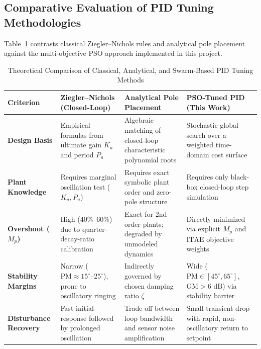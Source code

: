 \documentclass[11pt,a4paper]{article}
\begin{document}
\subsection{Comparative Evaluation of PID Tuning Methodologies}
Table~\ref{tab:method_comparison} contrasts classical Ziegler--Nichols rules and analytical pole placement against the multi-objective PSO approach implemented in this project.

\begin{table}[H]
  \centering
  \caption{Theoretical Comparison of Classical, Analytical, and Swarm-Based PID Tuning Methods}
  \label{tab:method_comparison}
  \small
  \begin{tabularx}{\textwidth}{>{\raggedright\arraybackslash}p{} >{\raggedright\arraybackslash}X >{\raggedright\arraybackslash}X >{\raggedright\arraybackslash}X}
    \toprule
    \textbf{Criterion} & \textbf{Ziegler--Nichols (Closed-Loop)} & \textbf{Analytical Pole Placement} & \textbf{PSO-Tuned PID (This Work)} \\
    \midrule
    \textbf{Design Basis} & Empirical formulas from ultimate gain $K_u$ and period $P_u$ & Algebraic matching of closed-loop characteristic polynomial roots & Stochastic global search over a weighted time-domain cost surface \\
    \addlinespace[3pt]
    \textbf{Plant Knowledge} & Requires marginal oscillation test ($K_u, P_u$) & Requires exact symbolic plant order and zero-pole structure & Requires only black-box closed-loop step simulation \\
    \addlinespace[3pt]
    \textbf{Overshoot ($M_p$)} & High ($40\%\text{--}60\%$) due to quarter-decay-ratio calibration & Exact for 2nd-order plants; degraded by unmodeled dynamics & Directly minimized via explicit $M_p$ and $\text{ITAE}$ objective weights \\
    \addlinespace[3pt]
    \textbf{Stability Margins} & Narrow ($\text{PM} \approx 15^\circ\text{--}25^\circ$), prone to oscillatory ringing & Indirectly governed by chosen damping ratio $\zeta$ & Wide ($\text{PM} \in [45^\circ, 65^\circ]$, $\text{GM} > 6\text{ dB}$) via stability barrier \\
    \addlinespace[3pt]
    \textbf{Disturbance Recovery} & Fast initial response followed by prolonged oscillation & Trade-off between loop bandwidth and sensor noise amplification & Small transient drop with rapid, non-oscillatory return to setpoint \\
    \bottomrule
  \end{tabularx}
\end{table}
\end{document}
